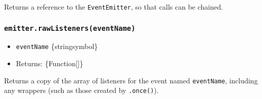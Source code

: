Returns a reference to the \texttt{EventEmitter}, so that calls can be
chained.

\subsubsection{\texorpdfstring{\texttt{emitter.rawListeners(eventName)}}{emitter.rawListeners(eventName)}}\label{emitter.rawlistenerseventname}

\begin{itemize}
\tightlist
\item
  \texttt{eventName} \{string\textbar symbol\}
\item
  Returns: \{Function{[}{]}\}
\end{itemize}

Returns a copy of the array of listeners for the event named
\texttt{eventName}, including any wrappers (such as those created by
\texttt{.once()}).

